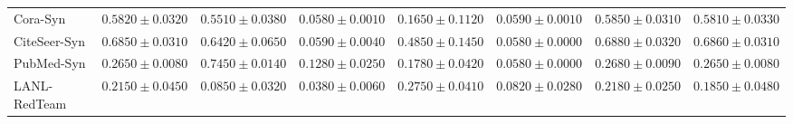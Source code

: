 \documentclass[11pt,a4paper]{article}
\begin{document}
\begin{table}[H]
\begin{tabular*}{\textwidth}{@{\extracolsep{\fill}}lrrrrrrr}
Cora-Syn & $0.5820 \pm 0.0320$ & $0.5510 \pm 0.0380$ & $0.0580 \pm 0.0010$ & $0.1650 \pm 0.1120$ & $0.0590 \pm 0.0010$ & $\mathbf{0.5850 \pm 0.0310}$ & $0.5810 \pm 0.0330$ \\
CiteSeer-Syn & $0.6850 \pm 0.0310$ & $0.6420 \pm 0.0650$ & $0.0590 \pm 0.0040$ & $0.4850 \pm 0.1450$ & $0.0580 \pm 0.0000$ & $\mathbf{0.6880 \pm 0.0320}$ & $0.6860 \pm 0.0310$ \\
PubMed-Syn & $0.2650 \pm 0.0080$ & $\mathbf{0.7450 \pm 0.0140}$ & $0.1280 \pm 0.0250$ & $0.1780 \pm 0.0420$ & $0.0580 \pm 0.0000$ & $0.2680 \pm 0.0090$ & $0.2650 \pm 0.0080$ \\\midrule
LANL-RedTeam & $0.2150 \pm 0.0450$ & $0.0850 \pm 0.0320$ & $0.0380 \pm 0.0060$ & $\mathbf{0.2750 \pm 0.0410}$ & $0.0820 \pm 0.0280$ & $0.2180 \pm 0.0250$ & $0.1850 \pm 0.0480$ \\\bottomrule
\end{tabular*}
\end{table}
\end{document}

